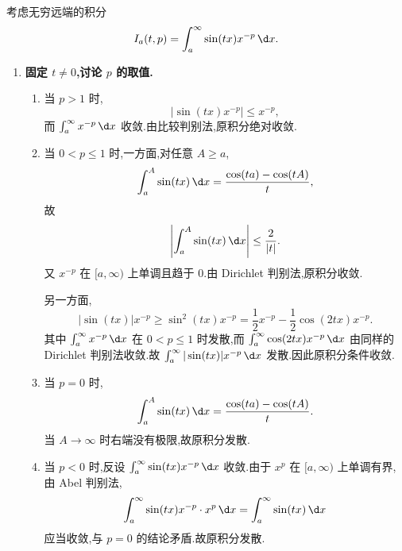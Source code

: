 \begin{example}
	考虑无穷远端的积分
	\begin{equation*}
		I_a(t,p)=\int_a^\infty \sin(tx)x^{-p}\,\d x.
	\end{equation*}

	\begin{enumerate}
		\item \textbf{固定 $t\neq0$,讨论 $p$ 的取值.}

		\begin{enumerate}
			\item 当 $p>1$ 时,
			\begin{equation*}
				|\sin(tx)x^{-p}|\leq x^{-p},
			\end{equation*}
			而 $\int_a^\infty x^{-p}\,\d x$ 收敛.由比较判别法,原积分绝对收敛.

			\item 当 $0<p\leq1$ 时,一方面,对任意 $A\geq a$,
			\begin{equation*}
				\int_a^A \sin(tx)\,\d x
				=
				\frac{\cos(ta)-\cos(tA)}{t},
			\end{equation*}
			故
			\begin{equation*}
				\left|\int_a^A \sin(tx)\,\d x\right|
				\leq \frac{2}{|t|}.
			\end{equation*}
			又 $x^{-p}$ 在 $[a,\infty)$ 上单调且趋于 $0$.由 Dirichlet 判别法,原积分收敛.

			另一方面,
			\begin{equation*}
				|\sin(tx)|x^{-p}
				\geq \sin^2(tx)x^{-p}
				=\frac12x^{-p}-\frac12\cos(2tx)x^{-p}.
			\end{equation*}
			其中 $\int_a^\infty x^{-p}\,\d x$ 在 $0<p\leq1$ 时发散,而 $\int_a^\infty \cos(2tx)x^{-p}\,\d x$ 由同样的 Dirichlet 判别法收敛.故 $\int_a^\infty |\sin(tx)|x^{-p}\,\d x$ 发散.因此原积分条件收敛.

			\item 当 $p=0$ 时,
			\begin{equation*}
				\int_a^A \sin(tx)\,\d x
				=
				\frac{\cos(ta)-\cos(tA)}{t}.
			\end{equation*}
			当 $A\to\infty$ 时右端没有极限,故原积分发散.

			\item 当 $p<0$ 时,反设 $\int_a^\infty \sin(tx)x^{-p}\,\d x$ 收敛.由于 $x^p$ 在 $[a,\infty)$ 上单调有界,由 Abel 判别法,
			\begin{equation*}
				\int_a^\infty \sin(tx)x^{-p}\cdot x^p\,\d x
				=
				\int_a^\infty \sin(tx)\,\d x
			\end{equation*}
			应当收敛,与 $p=0$ 的结论矛盾.故原积分发散.
		\end{enumerate}


\end{enumerate}
\end{example}
